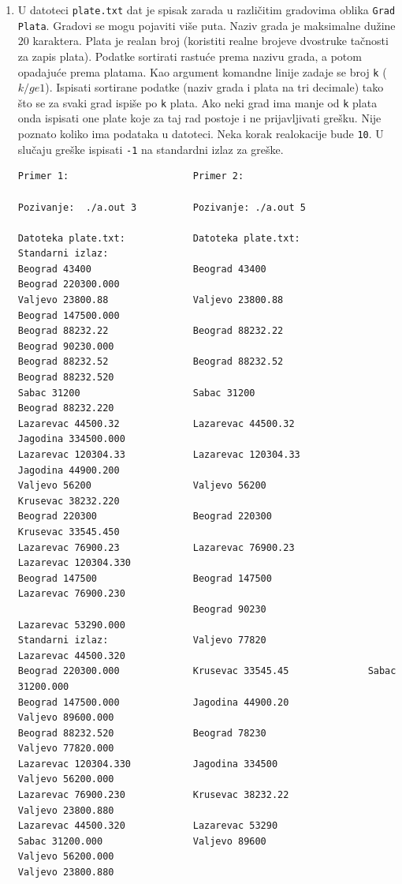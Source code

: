\begin{enumerate}
\item U datoteci {\tt plate.txt} dat je spisak zarada u različitim gradovima oblika {\tt Grad Plata}. Gradovi se mogu pojaviti više puta. Naziv grada je maksimalne dužine $20$ karaktera. Plata je realan broj (koristiti realne brojeve dvostruke tačnosti za zapis plata). Podatke sortirati rastuće prema nazivu grada, a potom opadajuće prema platama. Kao argument komandne linije zadaje se broj {\tt k} ($k /ge 1$). Ispisati sortirane podatke (naziv grada i plata na tri decimale) tako što se za svaki grad ispiše po {\tt k} plata. Ako neki grad ima manje od {\tt k} plata onda ispisati one plate koje za taj rad postoje i ne prijavljivati grešku. Nije poznato koliko ima podataka u datoteci. Neka korak realokacije bude {\tt 10}. U slučaju greške ispisati {\tt -1} na standardni izlaz za greške.
\begin{verbatim}
Primer 1:                      Primer 2:                   

Pozivanje:  ./a.out 3          Pozivanje: ./a.out 5                   
                                                                                
Datoteka plate.txt:            Datoteka plate.txt:            Standarni izlaz:
Beograd 43400                  Beograd 43400                  Beograd 220300.000
Valjevo 23800.88               Valjevo 23800.88               Beograd 147500.000
Beograd 88232.22               Beograd 88232.22               Beograd 90230.000
Beograd 88232.52               Beograd 88232.52               Beograd 88232.520
Sabac 31200                    Sabac 31200                    Beograd 88232.220
Lazarevac 44500.32             Lazarevac 44500.32             Jagodina 334500.000
Lazarevac 120304.33            Lazarevac 120304.33            Jagodina 44900.200
Valjevo 56200                  Valjevo 56200                  Krusevac 38232.220
Beograd 220300                 Beograd 220300                 Krusevac 33545.450
Lazarevac 76900.23             Lazarevac 76900.23             Lazarevac 120304.330
Beograd 147500                 Beograd 147500                 Lazarevac 76900.230
                               Beograd 90230                  Lazarevac 53290.000
Standarni izlaz:               Valjevo 77820                  Lazarevac 44500.320
Beograd 220300.000             Krusevac 33545.45              Sabac 31200.000
Beograd 147500.000             Jagodina 44900.20              Valjevo 89600.000
Beograd 88232.520              Beograd 78230                  Valjevo 77820.000
Lazarevac 120304.330           Jagodina 334500                Valjevo 56200.000
Lazarevac 76900.230            Krusevac 38232.22              Valjevo 23800.880
Lazarevac 44500.320            Lazarevac 53290
Sabac 31200.000                Valjevo 89600
Valjevo 56200.000
Valjevo 23800.880              


\end{verbatim}
\end{enumerate}
